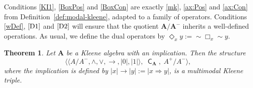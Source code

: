\documentclass{article}
\newtheorem{theorem}{Theorem}[section]
\DeclareMathOperator{\con}{\mathsf{C}}
\newcommand{\A}{\mathbf{A}}
\begin{document}
Conditions \eqref{KI1}, \eqref{BoxPos} and \eqref{BoxCon} are exactly \eqref{mk}, \eqref{ax:Pos} and \eqref{ax:Con} from
Definition~\ref{def:modal-kleene}, adapted to a family of operators. Conditions \eqref{wDef}, $\eqref{D1}$ and $\eqref{D2}$ will
ensure that the quotient $\A/\A^{-}$ inherits a well-defined operations. As usual, we define the dual
operators by $\Diamond_x y := \sim \Box_x \sim y$.

\begin{theorem}
\label{thm:quotient-DLI3}
Let $\A$ be a Kleene algebra with an implication. Then the structure
\[
    \big\langle \langle A/A^{-},\wedge,\vee,\to,|0|,|1|\rangle,\; \con_{\mathbf{A}},\; A^{+}/A^{-} \big\rangle,
\]
where the implication is defined by $|x| \to |y| := |x\Rightarrow y|$, is a multimodal Kleene triple.
\end{theorem}
\end{document}
